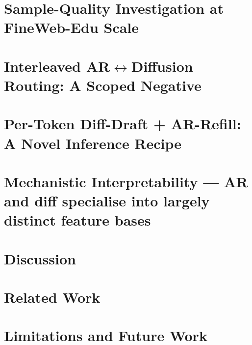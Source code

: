 \documentclass[11pt]{article}
\begin{document}
\section{Sample-Quality Investigation at FineWeb-Edu Scale}
\label{sec:sample-quality}


\section{Interleaved AR$\leftrightarrow$Diffusion Routing: A Scoped Negative}
\label{sec:interleaved}


\section{Per-Token Diff-Draft + AR-Refill: A Novel Inference Recipe}
\label{sec:diff-draft-refill}


\section{Mechanistic Interpretability — AR and diff specialise into largely distinct feature bases}
\label{sec:interpretability}


\section{Discussion}


\section{Related Work}


\section{Limitations and Future Work}
\label{sec:limitations}




\end{document}
